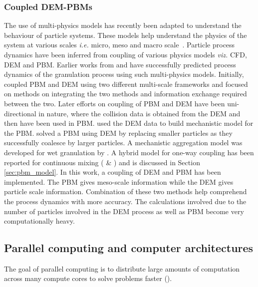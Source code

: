 \documentclass[preprint,11pt,authoryear]{elsarticle}
\begin{document}
\subsubsection{Coupled DEM-PBMs}
 The use of multi-physics models has recently been adapted to understand the behaviour of 
particle systems. These models help understand the physics of the system at various scales 
\textit{i.e.} micro, meso and macro scale~\citep{sen2014}. Particle process dynamics have been 
inferred from coupling of various physics models \textit{viz.} CFD, 
DEM and PBM. Earlier works from \cite{sen2014} and \cite{Barrasso2015cerd} have successfully 
predicted process dynamics of the granulation process using such multi-physics models.
 Initially, \cite{ingram2005} coupled PBM and DEM using two different multi-scale frameworks and 
focused on methods on integrating the two methods and information exchange required between the 
two. Later efforts on coupling of PBM and DEM have been uni-directional in nature, where the collision 
data is obtained from the DEM and then have been used in PBM. \cite{gantt2006} used the DEM data 
to build mechanistic model for the PBM. \cite{Goldschmidt2003} solved a PBM using DEM by 
replacing smaller particles as they successfully coalesce by larger particles. A mechanistic aggregation 
model was developed for wet granulation by \cite{Reinhold2012}. A hybrid model for one-way coupling 
has been reported for continuous mixing (\cite{sen2013} \& \cite{sen2013b}) and is discussed in Section \ref{sec:pbm_model}.
 In this work, a coupling of DEM and PBM has been implemented. The PBM gives meso-scale 
information while the DEM gives particle scale information. Combination of these two methods help 
comprehend the process dynamics with more accuracy. The calculations involved due to the number 
of particles involved in the DEM process as well as PBM become very computationally heavy. %


\subsection{Parallel computing and computer architectures}
 The goal of parallel computing is to distribute large amounts of computation across many 
compute cores to solve problems faster (\cite{wilkinson2005}).
\end{document}
